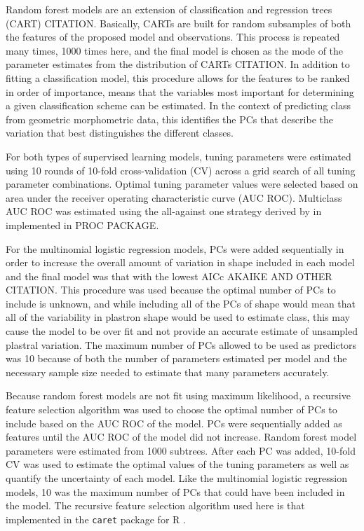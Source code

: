 \documentclass[12pt,letterpaper]{article}\usepackage{graphicx, color}
\begin{document}
Random forest models are an extension of classification and regression trees (CART) CITATION. Basically, CARTs are built for random subsamples of both the features of the proposed model and observations. This process is repeated many times, 1000 times here, and the final model is chosen as the mode of the parameter estimates from the distribution of CARTs CITATION. In addition to fitting a classification model, this procedure allows for the features to be ranked in order of importance, means that the variables most important for determining a given classification scheme can be estimated. In the context of predicting class from geometric morphometric data, this identifies the PCs that describe the variation that best distinguishes the different classes.


For both types of supervised learning models, tuning parameters were estimated using 10 rounds of 10-fold cross-validation (CV) across a grid search of all tuning parameter combinations. Optimal tuning parameter values were selected based on area under the receiver operating characteristic curve (AUC ROC). Multiclass AUC ROC was estimated using the all-against one strategy derived by \citet{Hand2001} in implemented in PROC PACKAGE.

For the multinomial logistic regression models, PCs were added sequentially in order to increase the overall amount of variation in shape included in each model and the final model was that with the lowest AICc \citep{Burnham2002a} AKAIKE AND OTHER CITATION. This procedure was used because the optimal number of PCs to include is unknown, and while including all of the PCs of shape would mean that all of the variability in plastron shape would be used to estimate class, this may cause the model to be over fit and not provide an accurate estimate of unsampled plastral variation. The maximum number of PCs allowed to be used as predictors was 10 because of both the number of parameters estimated per model and the necessary sample size needed to estimate that many parameters accurately.

Because random forest models are not fit using maximum likelihood, a recursive feature selection algorithm was used to choose the optimal number of PCs to include based on the AUC ROC of the model. PCs were sequentially added as features until the AUC ROC of the model did not increase. Random forest model parameters were estimated from 1000 subtrees. After each PC was added, 10-fold CV was used to estimate the optimal values of the tuning parameters as well as quantify the uncertainty of each model. Like the multinomial logistic regression models, 10 was the maximum number of PCs that could have been included in the model. The recursive feature selection algorithm used here is that implemented in the \texttt{caret} package for R \citep{Kuhn2013}.
\end{document}
